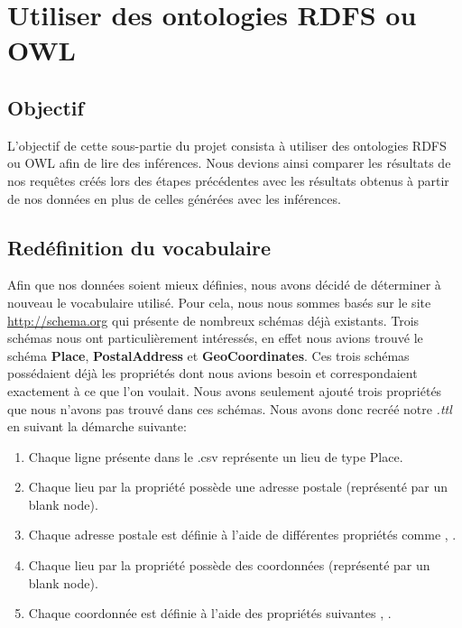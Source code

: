 \documentclass[a4paper,10pt]{article}
\begin{document}
\newpage
\section{Utiliser des ontologies RDFS ou OWL}
\subsection{Objectif}
L’objectif de cette sous-partie du projet consista à utiliser des ontologies RDFS ou OWL afin de lire des inférences. Nous devions ainsi comparer les résultats de nos requêtes créés lors des étapes précédentes avec les résultats obtenus à partir de nos données en plus de celles générées avec les inférences.

\subsection{Redéfinition du vocabulaire}
Afin que nos données soient mieux définies, nous avons décidé de déterminer à nouveau le vocabulaire utilisé. Pour cela, nous nous sommes basés sur le site \url{http://schema.org} qui présente de nombreux schémas déjà existants. Trois schémas nous ont particulièrement intéressés, en effet nous avions trouvé le schéma \textbf{Place}, \textbf{PostalAddress} et \textbf{GeoCoordinates}. Ces trois schémas possédaient déjà les propriétés dont nous avions besoin et correspondaient exactement à ce que l'on voulait. Nous avons seulement ajouté trois propriétés que nous n'avons pas trouvé dans ces schémas. Nous avons donc recréé notre \emph{.ttl} en suivant la démarche suivante:
\begin{enumerate}
    \item{Chaque ligne présente dans le .csv représente un lieu de type Place.}
    \item{Chaque lieu par la propriété \textbf{} possède une adresse postale (représenté par un blank node).}
    \item{Chaque adresse postale est définie à l'aide de différentes propriétés comme \textbf{}, \textbf{}.}
    \item{Chaque lieu par la propriété \textbf{} possède des coordonnées (représenté par un blank node).}
    \item{Chaque coordonnée est définie à l'aide des propriétés suivantes \textbf{}, \textbf{}.}
\end{enumerate}
\end{document}
